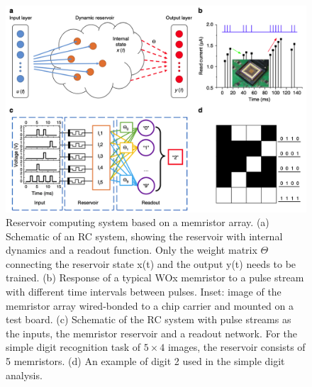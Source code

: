 \documentclass[11pt, oneside]{article}
\begin{document}
\begin{figure}[H]
    \centering
    \includegraphics[width=\textwidth]{figs/reservoir-memristor-1.png}

    \caption{Reservoir computing system based on a memristor array. (a) Schematic of an RC system, showing the reservoir with internal dynamics and a readout function. Only the weight matrix \(\Theta\) connecting the reservoir state x(t) and the output y(t) needs to be trained. (b) Response of a typical WOx memristor to a pulse stream with different time intervals between pulses. Inset: image of the memristor array wired-bonded to a chip carrier and mounted on a test board. (c) Schematic of the RC system with pulse streams as the inputs, the memristor reservoir and a readout network. For the simple digit recognition task of \( 5 \times 4 \) images, the reservoir consists of 5 memristors. (d) An example of digit 2 used in the simple digit analysis.}
\end{figure}
\end{document}
